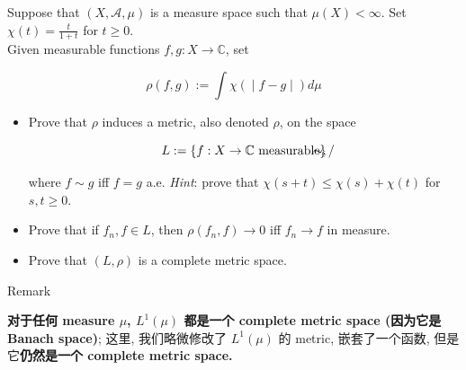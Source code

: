 \documentclass{qlnotes-export}
\begin{document}
Suppose that \((X,\mathcal{A},\mu)\) is a measure space such that \(\mu(X) < \infty\). Set \(\chi(t) = \frac{t}{1 + t}\) for \(t \geq 0\).\\
Given measurable functions \(f,g:X\rightarrow{\mathbb{C}}\), set

\[\left. \rho(f,g) := \int\chi( \middle| f - g \middle| ) d\mu \right.\]

\begin{itemize}
\item
  Prove that \(\rho\) induces a metric, also denoted \(\rho\), on the space

  \[L := \left\{ {f:X\rightarrow{\mathbb{C}}\ \text{measurable}} \right\}/\mspace{-18mu}\mspace{-18mu} \sim ,\]

  where \(f \sim g\) iff \(f = g\) a.e. \emph{Hint}: prove that \(\chi(s + t) \leq \chi(s) + \chi(t)\) for \(s,t \geq 0\).
\item
  Prove that if \(f_{n},f \in L\), then \(\rho(f_{n},f)\rightarrow 0\) iff \(f_{n}\rightarrow f\) in measure.
\item
  Prove that \((L,\rho)\) is a complete metric space.
\end{itemize}

\begin{qlremark}{Remark}

\textbf{对于任何 measure \(\mu\), \(L^{1}(\mu)\) 都是一个 complete metric space (因为它是 Banach space)}; 这里, 我们略微修改了 \(L^{1}(\mu)\) 的 metric, 嵌套了一个函数, 但是它\textbf{仍然是一个 complete metric space.}

\end{qlremark}
\end{document}
